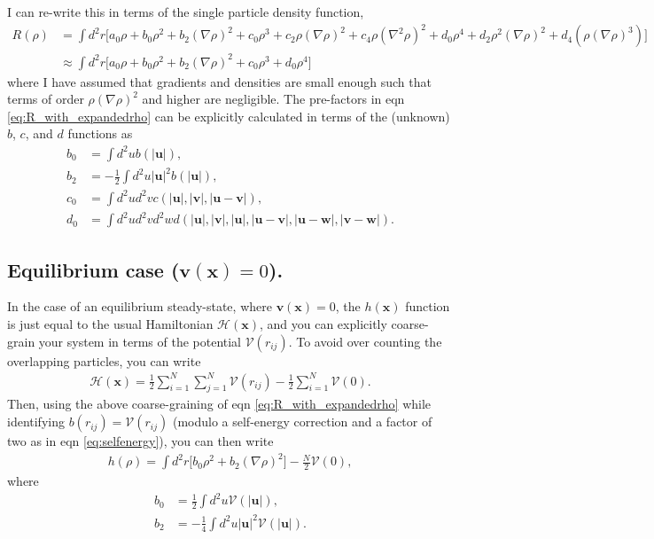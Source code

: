 \documentclass{article}
\begin{document}
I can re-write this in terms of the single particle density function,
\begin{align}\label{eq:R_with_expandedrho}
  R(\rho) &= \int d^2r\big[ a_0\rho + b_0\rho^2 + b_2 (\nabla\rho)^2
            + c_0 \rho^3 + c_2\rho(\nabla\rho)^2 + c_4\rho(\nabla^2\rho)^2
            + d_0 \rho^4 + d_2\rho^2(\nabla\rho)^2 + d_4(\rho(\nabla\rho)^3)\big]\nonumber\\
          &\approx \int d^2r\big[a_0\rho + b_0\rho^2+b_2(\nabla\rho)^2+c_0\rho^3+d_0\rho^4\big]
\end{align}
where I have assumed that gradients and densities are small enough such that terms of
order $\rho(\nabla\rho)^2$ and higher are negligible. The pre-factors in eqn
\ref{eq:R_with_expandedrho} can be explicitly calculated in terms of the (unknown)
$b$, $c$, and $d$ functions as
\begin{align}
  b_0 & = \int d^2u b(|\bm{u}|),\\
  b_2 & = -\frac{1}{2}\int d^2u |\bm{u}|^2b(|\bm{u}|),\\
  c_0 & = \int d^2ud^2vc(|\bm{u}|,|\bm{v}|,|\bm{u}-\bm{v}|),\\
  d_0 & = \int d^2ud^2vd^2w d(|\bm{u}|,|\bm{v}|,|\bm{u}|,|\bm{u}-\bm{v}|,
        |\bm{u}-\bm{w}|,|\bm{v}-\bm{w}|).
\end{align}

\subsection{Equilibrium case ($\bm{v}(\bm{x})=0$).}
In the case of an equilibrium steady-state, where $\bm{v}(\bm{x})=0$, the $h(\bm{x})$ function is
just equal to the usual Hamiltonian $\mathcal{H}(\bm{x})$, and you can explicitly coarse-grain your
system in terms of the potential $\mathcal{V}(r_{ij})$. To avoid over counting the overlapping
particles, you can write
\begin{align}\label{eq:selfenergy}
  \mathcal{H}(\bm{x}) = \frac{1}{2}\sum_{i=1}^N\sum_{j=1}^N\mathcal{V}(r_{ij})
  -\frac{1}{2}\sum_{i=1}^N\mathcal{V}(0).
\end{align}
Then, using the above coarse-graining of eqn \ref{eq:R_with_expandedrho} while identifying
$b(r_{ij})=\mathcal{V}(r_{ij})$ (modulo a self-energy correction and a factor of two as in
eqn \ref{eq:selfenergy}), you can then write
\begin{align}\label{eq:naive_heq}
  h(\rho) = \int d^2r\big[ b_0\rho^2 + b_2 (\nabla\rho)^2\big]-\frac{N}{2}\mathcal{V}(0),
\end{align}
where
\begin{align}\label{eq:equilibrium_coefficients}
  b_0 & = \frac{1}{2}\int d^2u \mathcal{V}(|\bm{u}|),\\
  b_2 & = -\frac{1}{4}\int d^2u |\bm{u}|^2 \mathcal{V}(|\bm{u}|).
\end{align}
\end{document}
